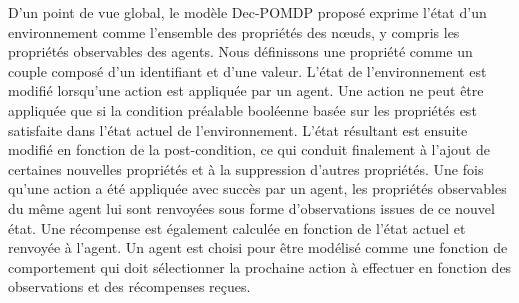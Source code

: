 \noindent
D'un point de vue global, le modèle Dec-POMDP proposé exprime l'état d'un environnement comme l'ensemble des propriétés des nœuds, y compris les propriétés observables des agents. Nous définissons une propriété comme un couple composé d'un identifiant et d'une valeur. L'état de l'environnement est modifié lorsqu'une action est appliquée par un agent. Une action ne peut être appliquée que si la condition préalable booléenne basée sur les propriétés est satisfaite dans l'état actuel de l'environnement. L'état résultant est ensuite modifié en fonction de la post-condition, ce qui conduit finalement à l'ajout de certaines nouvelles propriétés et à la suppression d'autres propriétés. Une fois qu'une action a été appliquée avec succès par un agent, les propriétés observables du même agent lui sont renvoyées sous forme d'observations issues de ce nouvel état. Une récompense est également calculée en fonction de l'état actuel et renvoyée à l'agent. Un agent est choisi pour être modélisé comme une fonction de comportement qui doit sélectionner la prochaine action à effectuer en fonction des observations et des récompenses reçues.

